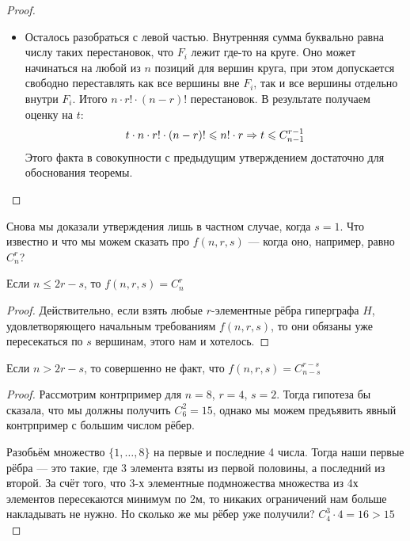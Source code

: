 \begin{proof}
\begin{itemize}
		\item Осталось разобраться с левой частью. Внутренняя сумма буквально равна числу таких перестановок, что $F_i$ лежит где-то на круге. Оно может начинаться на любой из $n$ позиций для вершин круга, при этом допускается свободно переставлять как все вершины вне $F_i$, так и все вершины отдельно внутри $F_i$. Итого $n \cdot r! \cdot (n - r)!$ перестановок. В результате получаем оценку на $t$:
		\[
			t \cdot n \cdot r! \cdot (n - r)! \leqslant n! \cdot r \Rightarrow t \leqslant C_{n - 1}^{r - 1}
		\]
		Этого факта в совокупности с предыдущим утверждением достаточно для обоснования теоремы.
	\end{itemize}
\end{proof}

\begin{note}
	Снова мы доказали утверждения лишь в частном случае, когда $s = 1$. Что известно и что мы можем сказать про $f(n, r, s)$ --- когда оно, например, равно $C_n^r$?
\end{note}

\begin{proposition}
	Если $n \le 2r - s$, то $f(n, r, s) = C_n^r$
\end{proposition}

\begin{proof}
	Действительно, если взять любые $r$-элементные рёбра гиперграфа $H$, удовлетворяющего начальным требованиям $f(n, r, s)$, то они обязаны уже пересекаться по $s$ вершинам, этого нам и хотелось.
\end{proof}

\begin{proposition}
	Если $n > 2r - s$, то совершенно не факт, что $f(n, r, s) = C_{n - s}^{r - s}$
\end{proposition}

\begin{proof}
	Рассмотрим контрпример для $n = 8$, $r = 4$, $s = 2$. Тогда гипотеза бы сказала, что мы должны получить $C_6^2 = 15$, однако мы можем предъявить явный контрпример с большим числом рёбер.
	
	Разобьём множество $\{1, \ldots, 8\}$ на первые и последние 4 числа. Тогда наши первые рёбра --- это такие, где 3 элемента взяты из первой половины, а последний из второй. За счёт того, что 3-х элементные подмножества множества из 4х элементов пересекаются минимум по 2м, то никаких ограничений нам больше накладывать не нужно. Но сколько же мы рёбер уже получили? $C_4^3 \cdot 4 = 16 > 15$
\end{proof}

